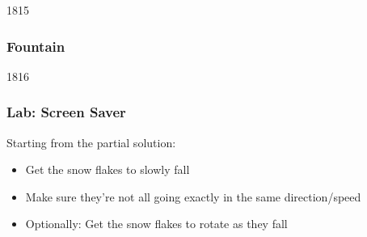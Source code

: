 
\begin{slide}{1815}\frametitle{Fountain}


\vspace*{-10em}\hfill{}
\end{slide}


\begin{slide}{1816}\frametitle{Lab: Screen Saver}

Starting from the partial solution:

\begin{itemize}
\item Get the snow flakes to slowly fall
\item Make sure they're not all going exactly in the same direction/speed
\item Optionally: Get the snow flakes to rotate as they fall
\end{itemize}

\end{slide}

